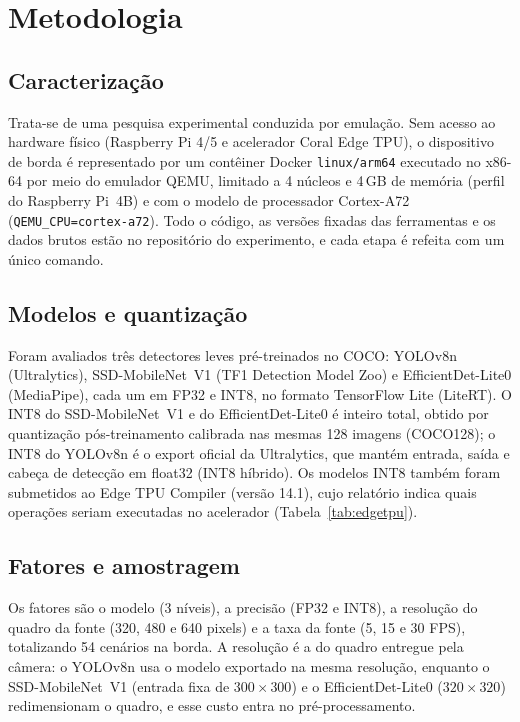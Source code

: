 \section{Metodologia}
\label{sec:metodologia}

\subsection{Caracterização}
Trata-se de uma pesquisa experimental conduzida por emulação. Sem acesso ao hardware físico
(Raspberry Pi 4/5 e acelerador Coral Edge TPU), o dispositivo de borda é representado por um
contêiner Docker \texttt{linux/arm64} executado no x86-64 por meio do emulador QEMU, limitado a
4 núcleos e 4\,GB de memória (perfil do Raspberry Pi~4B) e com o modelo de processador
Cortex-A72 (\texttt{QEMU\_CPU=cortex-a72}). Todo o código, as versões fixadas das ferramentas e os
dados brutos estão no repositório do experimento, e cada etapa é refeita com um único comando.

\subsection{Modelos e quantização}
Foram avaliados três detectores leves pré-treinados no COCO: YOLOv8n (Ultralytics), SSD-MobileNet~V1
(TF1 Detection Model Zoo) e EfficientDet-Lite0 (MediaPipe), cada um em FP32 e INT8, no formato
TensorFlow Lite (LiteRT). O INT8 do SSD-MobileNet~V1 e do EfficientDet-Lite0 é inteiro total, obtido por
quantização pós-treinamento calibrada nas mesmas 128 imagens (COCO128); o INT8 do YOLOv8n é o
export oficial da Ultralytics, que mantém entrada, saída e cabeça de detecção em float32 (INT8
híbrido). Os modelos INT8 também foram submetidos ao Edge TPU Compiler (versão 14.1), cujo relatório
indica quais operações seriam executadas no acelerador (Tabela~\ref{tab:edgetpu}).

\subsection{Fatores e amostragem}
Os fatores são o modelo (3 níveis), a precisão (FP32 e INT8), a resolução do quadro da fonte (320, 480
e 640 pixels) e a taxa da fonte (5, 15 e 30 FPS), totalizando 54 cenários na borda. A resolução é a do
quadro entregue pela câmera: o YOLOv8n usa o modelo exportado na mesma resolução, enquanto o
SSD-MobileNet~V1 (entrada fixa de $300\times300$) e o EfficientDet-Lite0 ($320\times320$) redimensionam o
quadro, e esse custo entra no pré-processamento.

